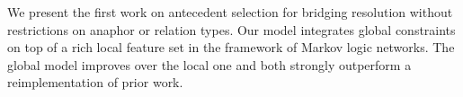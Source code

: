We present the first work on antecedent selection for bridging resolution without restrictions on anaphor or relation types. Our model integrates global
 constraints on top of a rich local feature set in the framework of Markov logic
 networks. The global model improves over the local one and both strongly
 outperform a reimplementation of prior work.

